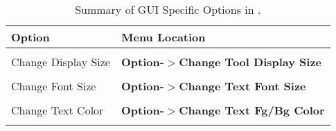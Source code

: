 {\footnotesize
\begin{table}
 \begin{center}
 \caption{Summary of GUI Specific Options in \program .}
 \label{tab:gui_option_summary}
  \vskip 12pt
  \begin{tabular}{|ll|} \hline
Option & Menu Location \\ \hline\hline
 &  \\
Change Display Size & {\bf Option-$>$Change Tool Display Size} \\
 &  \\
Change Font Size & {\bf Option-$>$Change Text Font Size} \\
 &  \\
Change Text Color & {\bf Option-$>$Change Text Fg/Bg Color} \\
 &  \\ \hline
   \end{tabular}
  \end{center}
\end{table}
}

